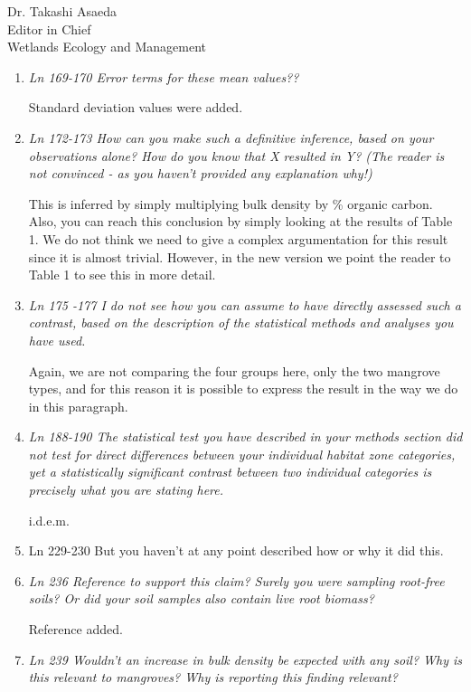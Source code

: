 \documentclass[11pt]{bgcletter}
\begin{document}
\begin{letter}{Dr. Takashi Asaeda\\
 Editor in Chief \\ Wetlands Ecology and Management}
\begin{enumerate}
{\color{blue} Sorry for the confusion. In the ANOVA we didn't compare four categorical zones as the reviewer thought, but only the two groups of mangrove types: fringe and basin. Therefore the Tukey post-hoc test is not needed. }

\item {\it Ln 169-170 Error terms for these mean values??}

{\color{blue} Standard deviation values were added. }

\item {\it Ln 172-173 How can you make such a definitive inference, based on your observations alone? How do you know that X resulted in Y? (The reader is not convinced - as you haven't provided any explanation why!)}

{\color{blue} This is inferred by simply multiplying bulk density by \% organic carbon. Also, you can reach this conclusion by simply looking at the results of Table 1. We do not think we need to give a complex argumentation for this result since it is almost trivial. However, in the new version we point the reader to Table 1 to see this in more detail. }

\item {\it Ln 175 -177 I do not see how you can assume to have directly assessed such a contrast, based on the description of the statistical methods and analyses you have used.}

{\color{blue} Again, we are not comparing the four groups here, only the two mangrove types, and for this reason it is possible to express the result in the way we do in this paragraph.}

\item {\it Ln 188-190 The statistical test you have described in your methods section did not test for direct differences between your individual habitat zone categories, yet a statistically significant contrast between two individual categories is precisely what you are stating here. }

{\color{blue} i.d.e.m.}

\item Ln 229-230 But you haven't at any point described how or why it did this.

\item {\it Ln 236 Reference to support this claim? Surely you were sampling root-free soils? Or did your soil samples also contain live root biomass?}

{\color{blue} Reference added. }

\item {\it Ln 239 Wouldn't an increase in bulk density be expected with any soil? Why is this relevant to mangroves? Why is reporting this finding relevant?}


\end{enumerate}
\end{letter}
\end{document}

